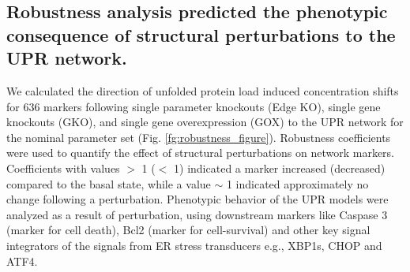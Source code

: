 \documentclass[fleqn,10pt]{wlscirep}
\begin{document}
\iffalse
This was most evident upon ATF4 feedback KO. We distinctly saw increase in sensitivity of feedback components associated with XBP1s and ATF6 (supplementary materials Fig. S\ref{fg:Sens_S3}). Upon ATF6 and XBP1s feedback KO, there wasn't much change in terms of sensitivity of the system. This further attests the key regulatory effect of ATF4 in mediating the positive BiP feedback which is an essential component of the adaptation phase of UPR. Another interesting observation was that when we completely knockout all the feedback branches of BiP in the adaptation phase, the system overall becomes relatively more robust (supplementary materials Fig. S\ref{fg:Sens_S3}). We distinctly saw a major shift of sensitivity of BiP upon removal of positive feedback. 
\fi


 

\subsection*{Robustness analysis predicted the phenotypic consequence of structural perturbations to the UPR network.} We calculated the direction of unfolded protein load induced concentration shifts for 636 markers following single parameter knockouts (Edge KO), single gene knockouts (GKO), and single gene overexpression (GOX) to the UPR network for the nominal parameter set (Fig. \ref{fg:robustness_figure}). Robustness coefficients were used to quantify the effect of structural perturbations on network markers. Coefficients with values $>$ 1 ($<$ 1) indicated a marker increased (decreased) compared to the basal state, while a value $\sim$ 1 indicated approximately no change following a perturbation. Phenotypic behavior of the UPR models were analyzed as a result of perturbation, using downstream markers like Caspase 3 (marker for cell death), Bcl2 (marker for cell-survival) and other key signal integrators of the signals from ER stress transducers e.g., XBP1s, CHOP and ATF4.
\end{document}
